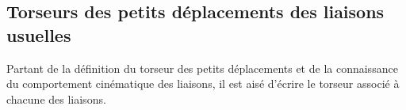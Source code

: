 \documentclass[10pt,oneside]{article}
\begin{document}
\subsection{Torseurs des petits déplacements des liaisons usuelles}
Partant de la définition du torseur des petits déplacements et de la connaissance du comportement cinématique des liaisons, il est aisé d'écrire le torseur associé à chacune des liaisons.


\end{document}
